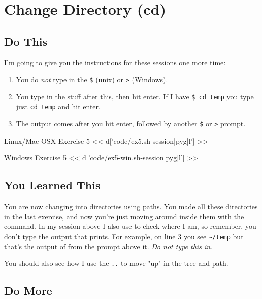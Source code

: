 \chapter{Change Directory (cd)}

\section{Do This}

I'm going to give you the instructions for these sessions one more time:

\begin{enumerate} 
\item You do \emph{not} type in the \verb|$| (unix) or \verb|>| (Windows).
\item You type in the stuff after this, then hit enter.  If I have \verb|$ cd temp| you type just \verb|cd temp| and hit enter.
\item The output comes after you hit enter, followed by another \verb|$| or \verb|>| prompt.
\end{enumerate}

\begin{code}{Linux/Mac OSX Exercise 5}
<< d['code/ex5.sh-session|pyg|l'] >>
\end{code}

\begin{code}{Windows Exercise 5}
<< d['code/ex5-win.sh-session|pyg|l'] >>
\end{code}

\section{You Learned This}

You are now changing into directories using paths.  You made all these directories
in the last exercise, and now you're just moving around inside them with the
 command.  In my session above I also use  to check
where I am, so remember, you don't type the output that  prints.
For example, on line 3 you see \verb|~/temp| but that's the output of 
from the prompt above it.  \emph{Do not type this in}.

You should also see how I use the \verb|..| to move "up" in the tree and path.



\section{Do More}

